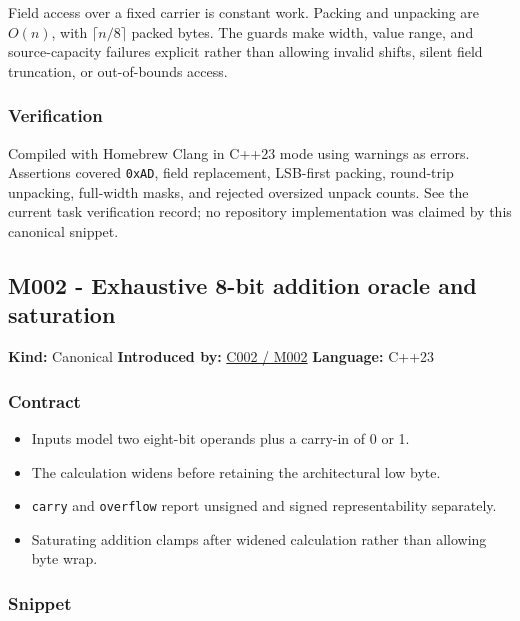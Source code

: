 Field access over a fixed carrier is constant work. Packing and unpacking are \(O(n)\), with \(\lceil n/8\rceil\) packed bytes. The guards make width, value range, and source-capacity failures explicit rather than allowing invalid shifts, silent field truncation, or out-of-bounds access.

\subsubsection{Verification}\label{appendix-4e2236f53445-verification}

Compiled with Homebrew Clang in C++23 mode using warnings as errors. Assertions covered \texttt{0xAD}, field replacement, LSB-first packing, round-trip unpacking, full-width masks, and rejected oversized unpack counts. See the current task verification record; no repository implementation was claimed by this canonical snippet.

\subsection{M002 - Exhaustive 8-bit addition oracle and saturation}\label{appendix-4e2236f53445-m002---exhaustive-8-bit-addition-oracle-and-saturation}

\textbf{Kind:} Canonical \textbf{Introduced by:} \hyperref[01-foundations-i-ch001-arithmetic-becomes-a-policy]{C002 / M002} \textbf{Language:} C++23

\subsubsection{Contract}\label{appendix-4e2236f53445-contract-1}

\begin{itemize}
\tightlist
\item
  Inputs model two eight-bit operands plus a carry-in of 0 or 1.
\item
  The calculation widens before retaining the architectural low byte.
\item
  \texttt{carry} and \texttt{overflow} report unsigned and signed representability separately.
\item
  Saturating addition clamps after widened calculation rather than allowing byte wrap.
\end{itemize}

\subsubsection{Snippet}\label{appendix-4e2236f53445-snippet-1}

